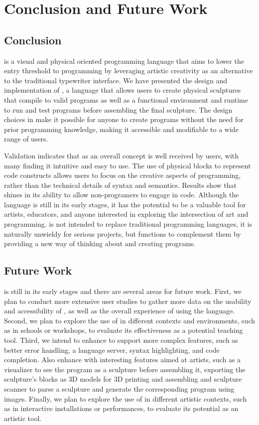 
\section{Conclusion and Future Work}
\label{sec:conclusion}
\subsection{Conclusion}
\label{sec:conclusion:conclusion}
\sculpt is a visual and physical oriented programming language that aims to lower the entry threshold to programming by leveraging artistic creativity as an alternative to the traditional typewriter interface.
We have presented the design and implementation of \sculpt, a language that allows users to create physical sculptures that compile to valid programs as well as a functional environment and runtime to run and test programs before assembling the final sculpture.
The design choices in \sculpt make it possible for anyone to create programs without the need for prior programming knowledge, making it accessible and modifiable to a wide range of users.

Validation indicates that \sculpt as an overall concept is well received by users, with many finding it intuitive and easy to use.
The use of physical blocks to represent code constructs allows users to focus on the creative aspects of programming, rather than the technical details of syntax and semantics.
Results show that \sculpt shines in its ability to allow non-programers to engage in code.
Although the language is still in its early stages, it has the potential to be a valuable tool for artists, educators, and anyone interested in exploring the intersection of art and programming.
\sculpt is not intended to replace traditional programming languages, it is naturally unwieldy for serious projects, but functions to complement them by providing a new way of thinking about and creating programs.




\subsection{Future Work}
\label{sec:conclusion:future}
\sculpt is still in its early stages and there are several areas for future work.
First, we plan to conduct more extensive user studies to gather more data on the usability and accessibility of \sculpt, as well as the overall experience of using the language.
Second, we plan to explore the use of \sculpt in different contexts and environments, such as in schools or workshops, to evaluate its effectiveness as a potential teaching tool.
Third, we intend to enhance \sculpter to support more complex features, such as better error handling, a language server, syntax highlighting, and code completion.
Also enhance \sculpter with interesting features aimed at artists, such as a visualizer to see the program as a sculpture before assembling it, exporting the sculpture's blocks as 3D models for 3D printing and assembling and sculpture scanner to parse a sculpture and generate the corresponding program using images.
Finally, we plan to explore the use of \sculpt in different artistic contexts, such as in interactive installations or performances, to evaluate its potential as an artistic tool.

\endinput

